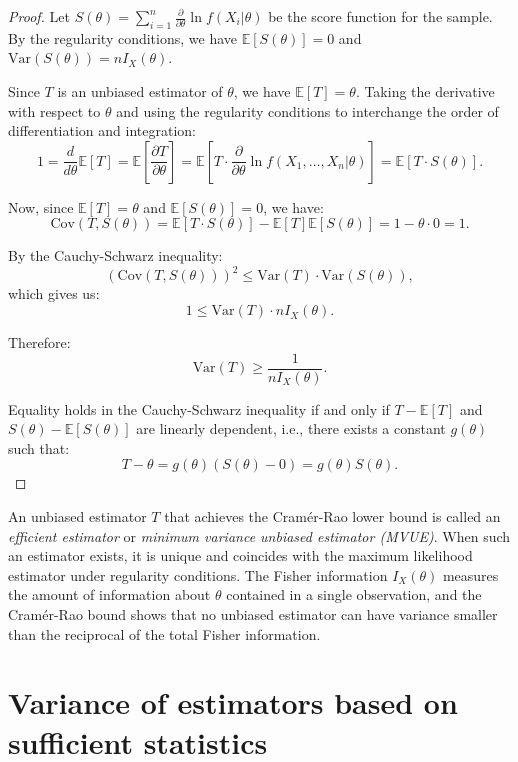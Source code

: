 \begin{proof}
    Let $S(\theta) = \sum_{i=1}^n \frac{\partial}{\partial \theta} \ln f(X_i|\theta)$ be the score function for the sample. By the regularity conditions, we have $\mathbb{E}[S(\theta)] = 0$ and $\text{Var}(S(\theta)) = nI_X(\theta)$.
    
    Since $T$ is an unbiased estimator of $\theta$, we have $\mathbb{E}[T] = \theta$. Taking the derivative with respect to $\theta$ and using the regularity conditions to interchange the order of differentiation and integration:
    \[
        1 = \frac{d}{d\theta}\mathbb{E}[T] = \mathbb{E}\left[\frac{\partial T}{\partial \theta}\right] = \mathbb{E}\left[T \cdot \frac{\partial}{\partial \theta} \ln f(X_1, \ldots, X_n|\theta)\right] = \mathbb{E}[T \cdot S(\theta)].
    \]
    
    Now, since $\mathbb{E}[T] = \theta$ and $\mathbb{E}[S(\theta)] = 0$, we have:
    \[
        \text{Cov}(T, S(\theta)) = \mathbb{E}[T \cdot S(\theta)] - \mathbb{E}[T] \mathbb{E}[S(\theta)] = 1 - \theta \cdot 0 = 1.
    \]
    
    By the Cauchy-Schwarz inequality:
    \[
        (\text{Cov}(T, S(\theta)))^2 \leq \text{Var}(T) \cdot \text{Var}(S(\theta)),
    \]
    which gives us:
    \[
        1 \leq \text{Var}(T) \cdot nI_X(\theta).
    \]
    
    Therefore:
    \[
        \text{Var}(T) \geq \frac{1}{nI_X(\theta)}.
    \]
    
    Equality holds in the Cauchy-Schwarz inequality if and only if $T - \mathbb{E}[T]$ and $S(\theta) - \mathbb{E}[S(\theta)]$ are linearly dependent, i.e., there exists a constant $g(\theta)$ such that:
    \[
        T - \theta = g(\theta)(S(\theta) - 0) = g(\theta)S(\theta).
    \]
\end{proof}

\begin{remark}
    An unbiased estimator $T$ that achieves the Cramér-Rao lower bound is called an \emph{efficient estimator} or \emph{minimum variance unbiased estimator (MVUE)}. When such an estimator exists, it is unique and coincides with the maximum likelihood estimator under regularity conditions. The Fisher information $I_X(\theta)$ measures the amount of information about $\theta$ contained in a single observation, and the Cramér-Rao bound shows that no unbiased estimator can have variance smaller than the reciprocal of the total Fisher information.
\end{remark}

\section{Variance of estimators based on sufficient statistics}

